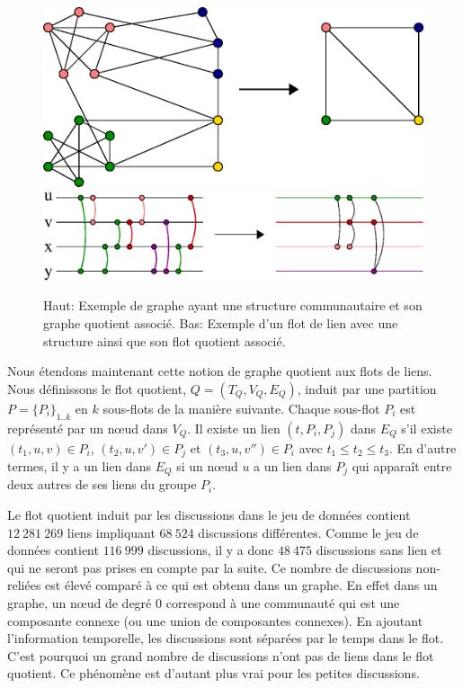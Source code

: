 \begin{figure}
\centering
	\includegraphics[width=0.50\linewidth]{img/mailing/graph-quotient}
	\vfill
	\includegraphics[width=0.75\linewidth]{img/mailing/stream-quotient}
	\caption{Haut: Exemple de graphe ayant une structure communautaire et son graphe quotient associé. Bas: Exemple d'un flot de lien avec une structure ainsi que son flot quotient associé.}
	\label{fig:graph-quotient}
\end{figure}

Nous étendons maintenant cette notion de graphe quotient aux flots de liens.
Nous définissons le flot quotient, $Q=(T_Q,V_Q,E_Q)$, induit par une partition $P=\{{P_i}\}_{1..k}$ en $k$ sous-flots de la manière suivante.
Chaque sous-flot $P_i$ est représenté par un n\oe{}ud dans $V_Q$.
Il existe un lien $(t,P_i,P_j)$ dans $E_Q$ s'il existe $(t_1,u,v) \in P_i$, $(t_2,u,v') \in P_j$ et $(t_3,u,v'') \in P_i$ avec $t_1 \leq t_2 \leq t_3$.
En d'autre termes, il y a un lien dans $E_Q$ si un n\oe{}ud $u$ a un lien dans $P_j$ qui apparaît entre deux autres de ses liens du groupe $P_i$.

Le flot quotient induit par les discussions dans le jeu de données contient $12\ 281\ 269$ liens impliquant $68\ 524$ discussions différentes.
Comme le jeu de données contient $116\ 999$ discussions, il y a donc $48\ 475$ discussions sans lien et qui ne seront pas prises en compte par la suite.
Ce nombre de discussions non-reliées est élevé comparé à ce qui est obtenu dans un graphe.
En effet dans un graphe, un n\oe{}ud de degré $0$ correspond à une communauté qui est une composante connexe (ou une union de composantes connexes).
En ajoutant l'information temporelle, les discussions sont séparées par le temps dans le flot.
C'est pourquoi un grand nombre de discussions n'ont pas de liens dans le flot quotient.
Ce phénomène est d'autant plus vrai pour les petites discussions.



